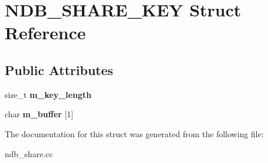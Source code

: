 \hypertarget{structNDB__SHARE__KEY}{}\section{N\+D\+B\+\_\+\+S\+H\+A\+R\+E\+\_\+\+K\+EY Struct Reference}
\label{structNDB__SHARE__KEY}
\subsection*{Public Attributes}
\begin{DoxyCompactItemize}
\item 
\mbox{\label{structNDB__SHARE__KEY_afae2a41c9d8c65717d3d2c3c3d6fb469}} 
size\+\_\+t {\bfseries m\+\_\+key\+\_\+length}
\item 
\mbox{\label{structNDB__SHARE__KEY_a1804d884b43a8730c3297a1b757a54aa}} 
char {\bfseries m\+\_\+buffer} \mbox{[}1\mbox{]}
\end{DoxyCompactItemize}


The documentation for this struct was generated from the following file\+:\begin{DoxyCompactItemize}
\item 
ndb\+\_\+share.\+cc\end{DoxyCompactItemize}
